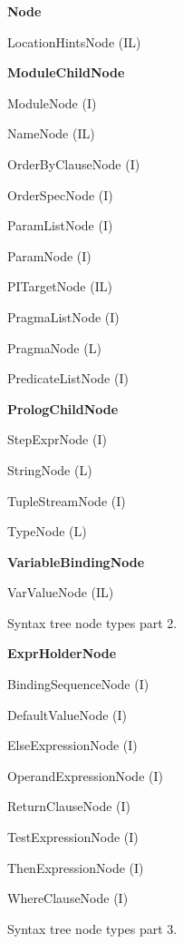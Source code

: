 \begin{figure}
\caption{Syntax tree node types part 2.}
\label{FIG_syntax_tree_node_types_part_2}
\begin{description}
\item \textbf{Node}
\begin{description}
\item LocationHintsNode (IL)
\item \textbf{ModuleChildNode}
\item ModuleNode (I)
\item NameNode (IL)
\item OrderByClauseNode (I)
\item OrderSpecNode (I)
\item ParamListNode (I)
\item ParamNode (I)
\item PITargetNode (IL)
\item PragmaListNode (I)
\item PragmaNode (L)
\item PredicateListNode (I)
\item \textbf{PrologChildNode}
\item StepExprNode (I)
\item StringNode (L)
\item TupleStreamNode (I)
\item TypeNode (L)
\item \textbf{VariableBindingNode}
\item VarValueNode (IL)
\end{description}
\end{description}
\end{figure}

\begin{figure}
\caption{Syntax tree node types part 3.}
\label{FIG_syntax_tree_node_types_part_3}
\begin{description}
\item \textbf{ExprHolderNode}
  \begin{description}
  \item BindingSequenceNode (I)
  \item DefaultValueNode (I)
  \item ElseExpressionNode (I)
  \item OperandExpressionNode (I)
  \item ReturnClauseNode (I)
  \item TestExpressionNode (I)
  \item ThenExpressionNode (I)
  \item WhereClauseNode (I)
  \end{description}
\end{description}
\end{figure}

